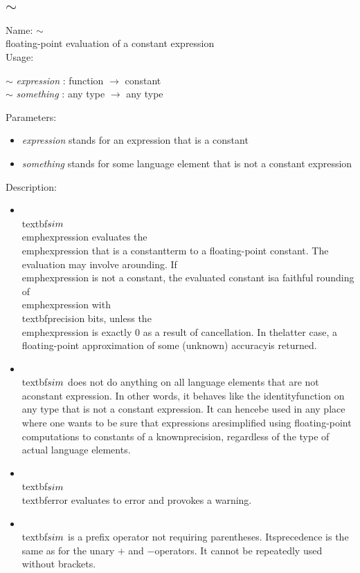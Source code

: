 \subsection{$\sim$}
\label{labapprox}
\noindent Name: \textbf{$\sim$}\\
floating-point evaluation of a constant expression\\
\noindent Usage: 
\begin{center}
\textbf{$\sim$} \emph{expression} : \textsf{function} $\rightarrow$ \textsf{constant}\\
\textbf{$\sim$} \emph{something} : \textsf{any type} $\rightarrow$ \textsf{any type}\\
\end{center}
Parameters: 
\begin{itemize}
\item \emph{expression} stands for an expression that is a constant
\item \emph{something} stands for some language element that is not a constant expression
\end{itemize}
\noindent Description: \begin{itemize}

\item \\textbf{$\\sim$} \\emph{expression} evaluates the \\emph{expression} that is a constant\n   term to a floating-point constant. The evaluation may involve a\n   rounding. If \\emph{expression} is not a constant, the evaluated constant is\n   a faithful rounding of \\emph{expression} with \\textbf{precision} bits, unless the\n   \\emph{expression} is exactly $0$ as a result of cancellation. In the\n   latter case, a floating-point approximation of some (unknown) accuracy\n   is returned.\n
\item \\textbf{$\\sim$} does not do anything on all language elements that are not a\n   constant expression.  In other words, it behaves like the identity\n   function on any type that is not a constant expression. It can hence\n   be used in any place where one wants to be sure that expressions are\n   simplified using floating-point computations to constants of a known\n   precision, regardless of the type of actual language elements.\n
\item \\textbf{$\\sim$} \\textbf{error} evaluates to error and provokes a warning.\n
\item \\textbf{$\\sim$} is a prefix operator not requiring parentheses. Its\n   precedence is the same as for the unary $+$ and $-$\n   operators. It cannot be repeatedly used without brackets.\n\end{itemize}
